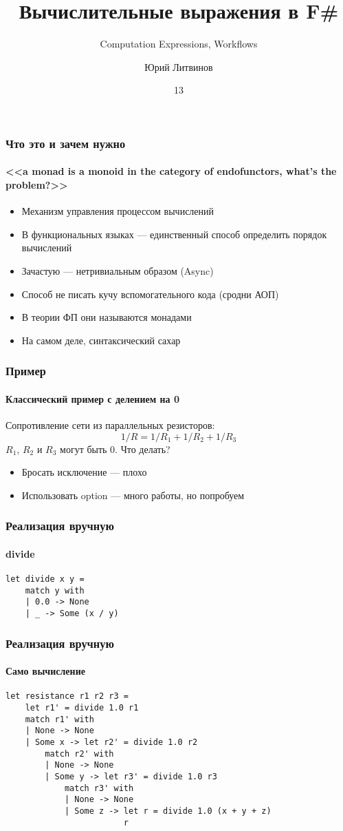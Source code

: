 \documentclass[xetex,mathserif,serif]{beamer}
\title{Вычислительные выражения в F\#}
\subtitle{Computation Expressions, Workflows}
\author{Юрий Литвинов}
\date{13}
\begin{document}
	
	\frame{\titlepage}
	
	\begin{frame}
		\frametitle{Что это и зачем нужно}
		\framesubtitle{<<a monad is a monoid in the category of endofunctors, what's the problem?>>}
		\begin{itemize}
			\item Механизм управления процессом вычислений
			\item В функциональных языках --- единственный способ определить порядок вычислений
			\item Зачастую --- нетривиальным образом (Async)
			\item Способ не писать кучу вспомогательного кода (сродни АОП)
			\item В теории ФП они называются монадами
			\item На самом деле, синтаксический сахар
		\end{itemize}
	\end{frame}	

	\begin{frame}
		\frametitle{Пример}
		\framesubtitle{Классический пример с делением на 0}
		Сопротивление сети из параллельных резисторов:
		$$1/R = 1/R_1 + 1/R_2 + 1/R_3$$
		$R_1$, $R_2$ и $R_3$ могут быть 0. Что делать?
		\begin{itemize}
			\item Бросать исключение --- плохо
			\item Использовать option --- много работы, но попробуем
		\end{itemize}
	\end{frame}	

	\begin{frame}[fragile]
		\frametitle{Реализация вручную}
		\framesubtitle{divide}
		\begin{verbatim}
let divide x y =
    match y with
    | 0.0 -> None
    | _ -> Some (x / y)
		\end{verbatim}
\end{frame}

	\begin{frame}[fragile]
		\frametitle{Реализация вручную}
		\framesubtitle{Само вычисление}
		\begin{verbatim}
let resistance r1 r2 r3 =
    let r1' = divide 1.0 r1
    match r1' with
    | None -> None
    | Some x -> let r2' = divide 1.0 r2
        match r2' with
        | None -> None
        | Some y -> let r3' = divide 1.0 r3
            match r3' with
            | None -> None
            | Some z -> let r = divide 1.0 (x + y + z)
                        r
		\end{verbatim}
\end{frame}
\end{document}
